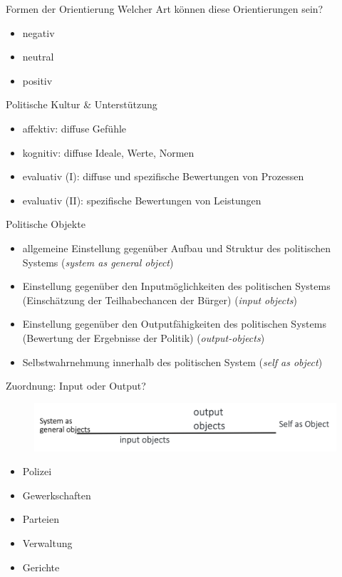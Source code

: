 \documentclass[11pt]{beamer}
\begin{document}
\begin{frame}[t]{Formen der Orientierung}
	Welcher Art können diese Orientierungen sein? \pause
	\begin{itemize}
		\item negativ
		\item neutral
		\item positiv
	\end{itemize}
\end{frame}

\begin{frame}[t]{Politische Kultur \& Unterstützung}
	\begin{itemize}
		\item affektiv: diffuse Gefühle \pause
		\item kognitiv: diffuse Ideale, Werte, Normen \pause
		\item evaluativ (I): diffuse und spezifische Bewertungen von Prozessen \pause
		\item evaluativ (II): spezifische Bewertungen von Leistungen
	\end{itemize}

\end{frame}

\begin{frame}[t]{Politische Objekte}
	 \pause
	\begin{itemize}
		\item allgemeine Einstellung gegenüber Aufbau und Struktur des politischen Systems (\textit{system as general object}) \pause
		\item Einstellung gegenüber den Inputmöglichkeiten des politischen Systems (Einschätzung der Teilhabechancen der Bürger) (\textit{input objects}) \pause
		\item Einstellung gegenüber den Outputfähigkeiten des politischen Systems (Bewertung der Ergebnisse der Politik) (\textit{output-objects}) \pause
		\item Selbstwahrnehmung innerhalb des politischen System (\textit{self as object})
	\end{itemize}
\end{frame}

\begin{frame}[t]{Zuordnung: Input oder Output?}
	\begin{figure}[ht]
		\includegraphics[width=\textwidth]{pics/s3-2.png}
	\end{figure}
	
	\begin{itemize}
		\item Polizei \pause
		\item Gewerkschaften \pause
		\item Parteien \pause
		\item Verwaltung \pause
		\item Gerichte \pause
	\end{itemize}
\end{frame}
\end{document}
